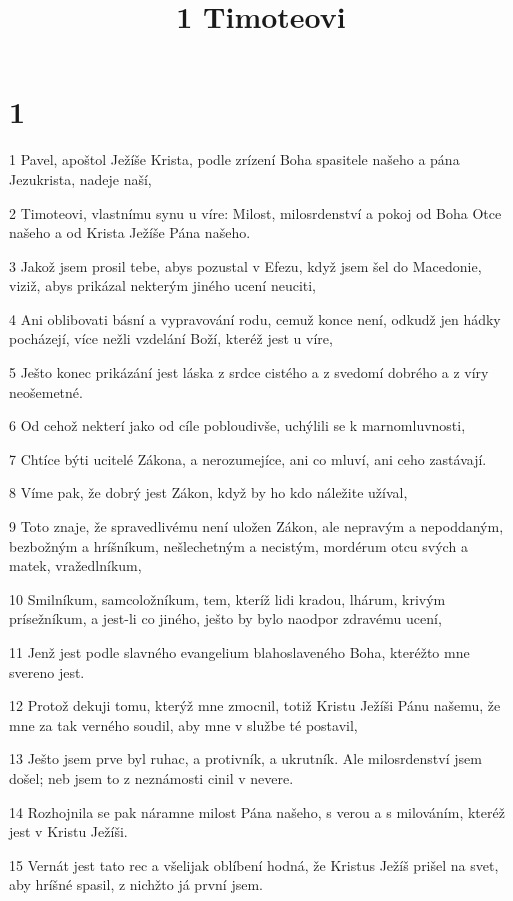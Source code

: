 

\title{1 Timoteovi}

\chapter{1}

\par 1 Pavel, apoštol Ježíše Krista, podle zrízení Boha spasitele našeho a pána Jezukrista, nadeje naší,
\par 2 Timoteovi, vlastnímu synu u víre: Milost, milosrdenství a pokoj od Boha Otce našeho a od Krista Ježíše Pána našeho.
\par 3 Jakož jsem prosil tebe, abys pozustal v Efezu, když jsem šel do Macedonie, viziž, abys prikázal nekterým jiného ucení neuciti,
\par 4 Ani oblibovati básní a vypravování rodu, cemuž konce není, odkudž jen hádky pocházejí, více nežli vzdelání Boží, kteréž jest u víre,
\par 5 Ješto konec prikázání jest láska z srdce cistého a z svedomí dobrého a z víry neošemetné.
\par 6 Od cehož nekterí jako od cíle pobloudivše, uchýlili se k marnomluvnosti,
\par 7 Chtíce býti ucitelé Zákona, a nerozumejíce, ani co mluví, ani ceho zastávají.
\par 8 Víme pak, že dobrý jest Zákon, když by ho kdo náležite užíval,
\par 9 Toto znaje, že spravedlivému není uložen Zákon, ale nepravým a nepoddaným, bezbožným a hríšníkum, nešlechetným a necistým, mordérum otcu svých a matek, vražedlníkum,
\par 10 Smilníkum, samcoložníkum, tem, kteríž lidi kradou, lhárum, krivým prísežníkum, a jest-li co jiného, ješto by bylo naodpor zdravému ucení,
\par 11 Jenž jest podle slavného evangelium blahoslaveného Boha, kteréžto mne svereno jest.
\par 12 Protož dekuji tomu, kterýž mne zmocnil, totiž Kristu Ježíši Pánu našemu, že mne za tak verného soudil, aby mne v službe té postavil,
\par 13 Ješto jsem prve byl ruhac, a protivník, a ukrutník. Ale milosrdenství jsem došel; neb jsem to z neznámosti cinil v nevere.
\par 14 Rozhojnila se pak náramne milost Pána našeho, s verou a s milováním, kteréž jest v Kristu Ježíši.
\par 15 Vernát jest tato rec a všelijak oblíbení hodná, že Kristus Ježíš prišel na svet, aby hríšné spasil, z nichžto já první jsem.
